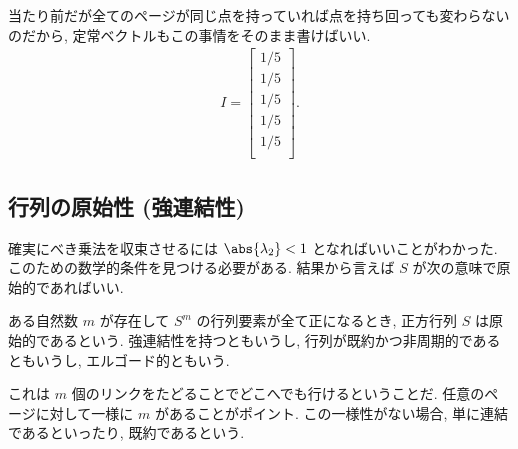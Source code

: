 \documentclass[openany, a4paper, oneside]{jsbook}
\begin{document}
当たり前だが全てのページが同じ点を持っていれば点を持ち回っても変わらないのだから,
定常ベクトルもこの事情をそのまま書けばいい.
\begin{align}
 I
 =
 \begin{bmatrix}
  1/5\\
  1/5\\
  1/5\\
  1/5\\
  1/5\\
 \end{bmatrix}
 .
\end{align}
\subsection{行列の原始性 (強連結性)}

確実にべき乗法を収束させるには $\abs{\lambda_2} < 1$ となればいいことがわかった.
このための数学的条件を見つける必要がある.
結果から言えば $S$ が次の意味で原始的であればいい.
\begin{defn}
ある自然数 $m$ が存在して $S^m$ の行列要素が全て正になるとき,
正方行列 $S$ は原始的であるという.
強連結性を持つともいうし,
行列が既約かつ非周期的であるともいうし,
エルゴード的ともいう.
\end{defn}
\begin{rem}
これは $m$ 個のリンクをたどることでどこへでも行けるということだ.
任意のページに対して一様に $m$ があることがポイント.
この一様性がない場合, 単に連結であるといったり,
既約であるという.
\end{rem}
\end{document}
